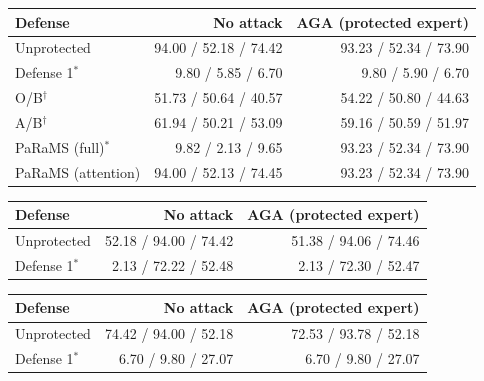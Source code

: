 \begin{tabular}{lrr}
\toprule
Defense & No attack & AGA (protected expert) \\
\midrule
Unprotected & 94.00 / 52.18 / 74.42 & 93.23 / 52.34 / 73.90 \\
Defense 1$^{*}$ & 9.80 / 5.85 / 6.70 & 9.80 / 5.90 / 6.70 \\
O/B$^{\dagger}$ & 51.73 / 50.64 / 40.57 & 54.22 / 50.80 / 44.63 \\
A/B$^{\dagger}$ & 61.94 / 50.21 / 53.09 & 59.16 / 50.59 / 51.97 \\
PaRaMS (full)$^{*}$ & 9.82 / 2.13 / 9.65 & 93.23 / 52.34 / 73.90 \\
PaRaMS (attention) & 94.00 / 52.13 / 74.45 & 93.23 / 52.34 / 73.90 \\
\bottomrule
\end{tabular}

\begin{tabular}{lrr}
\toprule
Defense & No attack & AGA (protected expert) \\
\midrule
Unprotected & 52.18 / 94.00 / 74.42 & 51.38 / 94.06 / 74.46 \\
Defense 1$^{*}$ & 2.13 / 72.22 / 52.48 & 2.13 / 72.30 / 52.47 \\
\bottomrule
\end{tabular}

\begin{tabular}{lrr}
\toprule
Defense & No attack & AGA (protected expert) \\
\midrule
Unprotected & 74.42 / 94.00 / 52.18 & 72.53 / 93.78 / 52.18 \\
Defense 1$^{*}$ & 6.70 / 9.80 / 27.07 & 6.70 / 9.80 / 27.07 \\
\bottomrule
\end{tabular}

